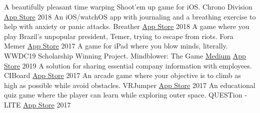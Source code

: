 

\begin{cventries}
  \cvcompactentry
    {A beautifully pleasant time warping Shoot'em up game for iOS.}
    {Chrono Division}
    {\href{https://itunes.apple.com/app/id1437675179}{App Store}}
    {2018}
  \cvcompactentry
    {An iOS/watchOS app with journaling and a breathing exercise to help with anxiety or panic attacks.}
    {Breather}
    {\href{https://itunes.apple.com/app/id1370659046}{App Store}}
    {2018}
  \cvcompactentry
    {A game where you play Brazil's unpopular president, Temer, trying to escape from riots.}
    {Fora Memer}
    {\href{https://itunes.apple.com/br/app/fora-memer/id1253655537}{App Store}}
    {2017}
  \cvcompactentry
    {A game for iPad where you blow minds, literally. WWDC19 Scholarship Winning Project.}
    {Mindblower: The Game}
    {\href{https://medium.freecodecamp.org/how-i-won-a-scholarship-to-apples-yearly-event-for-the-second-time-f04f5f4636b1}{Medium} \hspace{4pt} \href{https://itunes.apple.com/us/app/mindblower-the-game/id1460079689}{App Store}}
    {2019}
  \cvcompactentry
    {A solution for sharing essential company information with employees.}
    {CIBoard}
    {\href{https://itunes.apple.com/app/id1293364926}{App Store}}
    {2017}
  \cvcompactentry
    {An arcade game where your objective is to climb as high as possible while avoid obstacles.}
    {VRJumper}
    {\href{https://itunes.apple.com/app/id1262625055}{App Store}}
    {2017}
  \cvcompactentry
    {An educational quiz game where the player can learn while exploring outer space.}
    {QUESTion - LITE}
    {\href{https://itunes.apple.com/app/id1233411790}{App Store}}
    {2017}
\end{cventries}
